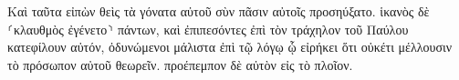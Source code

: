 \documentclass{openreader}
\begin{document}
Καὶ ταῦτα εἰπὼν θεὶς τὰ γόνατα αὐτοῦ σὺν πᾶσιν αὐτοῖς προσηύξατο. 
ἱκανὸς δὲ ⸂κλαυθμὸς ἐγένετο⸃ πάντων, καὶ ἐπιπεσόντες ἐπὶ τὸν τράχηλον τοῦ Παύλου κατεφίλουν αὐτόν, 
ὀδυνώμενοι μάλιστα ἐπὶ τῷ λόγῳ ᾧ εἰρήκει ὅτι οὐκέτι μέλλουσιν τὸ πρόσωπον αὐτοῦ θεωρεῖν. προέπεμπον δὲ αὐτὸν εἰς τὸ πλοῖον. 
\end{document}
